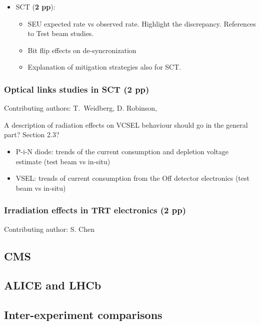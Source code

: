 
\begin{itemize}
\item SCT (\textbf{2 pp}): 
        \begin{itemize}
        \item SEU expected rate vs observed rate. Highlight the discrepancy. References to Test beam studies.
        \item Bit flip effects on de-syncronization
        \item Explanation of mitigation strategies also for SCT.
        \end{itemize}
\end{itemize}

\subsubsection{Optical links studies in SCT (\textbf{2 pp})}
\label{sec:electronics-ATLAS-Opto}
Contributing authors: T.~Weidberg, D. Robinson,

A description of radiation effects on VCSEL behaviour should go in the general part? Section 2.3?
\begin{itemize}
\item P-i-N diode: trends of the current consumption and depletion voltage estimate (test beam vs in-situ)
\item VSEL: trends of current consumption from the Off detector electronics (test beam vs in-situ)
\end{itemize}

\subsubsection{Irradiation effects in TRT electronics (2 pp)}
\label{sec:electronics-ATLAS-TRT}
Contributing author: S. Chen

\subsection{CMS}
\label{sec:electronics-CMS}

\subsection{ALICE and LHCb }
\label{sec:electronics-ALICE-LHCb}

\subsection{Inter-experiment comparisons}
\label{sec:electronics-comparisons}

